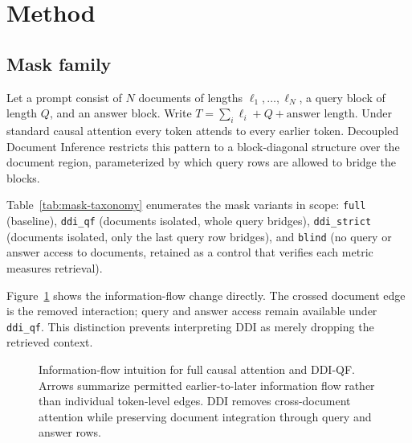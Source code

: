\section{Method}
\label{sec:method}

\subsection{Mask family}
\label{sec:method-masks}

Let a prompt consist of $N$ documents of lengths $\ell_1, \dots, \ell_N$,
a query block of length $Q$, and an answer block. Write
$T = \sum_i \ell_i + Q + \text{answer length}$. Under standard causal
attention every token attends to every earlier token. Decoupled Document
Inference restricts this pattern to a block-diagonal structure over the
document region, parameterized by which query rows are allowed to bridge
the blocks.

Table~\ref{tab:mask-taxonomy} enumerates the mask variants in scope:
\texttt{full} (baseline), \texttt{ddi\_qf} (documents isolated, whole
query bridges), \texttt{ddi\_strict} (documents isolated, only the last
query row bridges), and \texttt{blind} (no query or answer access to documents,
retained as a control that verifies each metric measures retrieval).

\begin{table}[t]
\centering
\caption{Mask taxonomy (T1). Regenerated from the canonical
    \texttt{paper/evidence.json} manifest on every build.}
\label{tab:mask-taxonomy}
\end{table}

Figure~\ref{fig:mask-geometry} shows the information-flow change directly.
The crossed document edge is the removed interaction; query and answer access
remain available under \texttt{ddi\_qf}. This distinction prevents interpreting
DDI as merely dropping the retrieved context.

\begin{figure}[t]
\centering
\resizebox{\linewidth}{!}{}
\caption{Information-flow intuition for full causal attention and DDI-QF.
    Arrows summarize permitted earlier-to-later information flow rather than
    individual token-level edges. DDI removes cross-document attention while
    preserving document integration through query and answer rows.}
\label{fig:mask-geometry}
\end{figure}

